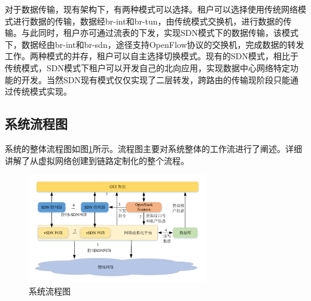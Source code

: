 对于数据传输，现有架构下，有两种模式可以选择。租户可以选择使用传统网络模式进行数据的传输，数据经br-int和br-tun，由传统模式交换机，进行数据的传输。与此同时，租户亦可通过流表的下发，实现SDN模式下的数据传输，该模式下，数据经由br-int和br-sdn，途径支持OpenFlow协议的交换机，完成数据的转发工作。两种模式的并存，租户可以自主选择切换模式。现有的SDN模式，相比于传统模式，SDN模式下租户可以开发自己的北向应用，实现数据中心网络特定功能的开发。当然SDN现有模式仅仅实现了二层转发，跨路由的传输现阶段只能通过传统模式实现。

\subsection{系统流程图}
系统的整体流程图如图\ref{fig:workflow}所示。流程图主要对系统整体的工作流进行了阐述。详细讲解了从虚拟网络创建到链路定制化的整个流程。

\begin{figure}[!htb]
  \centering
  \includegraphics[width=0.7\textwidth]{logo/workflow}
  \caption{系统流程图}
  \label{fig:workflow}
\end{figure}


